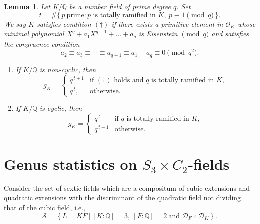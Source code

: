 \documentclass[11pt,reqno]{amsart}
\newcommand{\cD}{\mathcal{D}}
\newcommand{\cO}{\mathcal{O}}
\newtheorem{lemma}[theorem]{Lemma}
\theoremstyle{definition}
\theoremstyle{remark}
\begin{document}
\begin{lemma}\label{lemma:genus:number:degree:p:extensions}
Let $K/\mathbb{Q}$ be a number field of prime degree $q$.  Set
\begin{equation*}
    t
    = \#\bigl\{\, p\ \text{prime} : 
       p \text{ is totally ramified in } K,\ 
       p \equiv 1 \!\!\pmod q \,\bigr\}.
\end{equation*}
We say $K$ satisfies condition $(\dagger)$ if there exists a primitive element in $\cO_K$ whose minimal polynomial $X^q+a_1 X^{q-1} +\ldots+ a_q$ is Eisenstein $\pmod q$ and satisfies the congruence condition
\begin{equation*}
    a_{2}\equiv a_{3}\equiv\cdots\equiv a_{q-1}
    \equiv a_{1}+a_{q}\equiv 0 \pmod{q^{2}}.
\end{equation*}

\begin{enumerate}

\item[\textup{(1)}]
If $K/\mathbb{Q}$ is non-cyclic, then
\begin{equation*}
    g_K =
    \begin{cases}
        q^{\,t+1} & \text{if }(\dagger)\text{ holds and $q$ is totally ramified in $K$},\\[3pt]
        q^{\,t},  & \text{otherwise}.
    \end{cases}
\end{equation*}
\item[\textup{(2)}]
If $K/\mathbb{Q}$ is cyclic, then
\begin{equation*}
    g_K =
    \begin{cases}
        q^{\,t}   & \text{if $q$ is totally ramified in $K$},\\[3pt]
        q^{\,t-1} & \text{otherwise}.
    \end{cases}
\end{equation*}
\end{enumerate}
\end{lemma}

\noindent

\medskip

\section{\bf Genus statistics on $S_3\times C_2$-fields}\label{S_3xC_2}
\medskip

Consider the set of sextic fields which are a compositum of cubic extensions and quadratic extensions with the discriminant of the quadratic field not dividing that of the cubic field, i.e.,
\[
\mathcal{S} = \left\{ L = KF \ \bigg| \ [K : \mathbb{Q}] = 3, \ [F : \mathbb{Q}] = 2 \ \text{and} \,\, \cD_F \nmid  \cD_K \right\}.
\]
\end{document}
